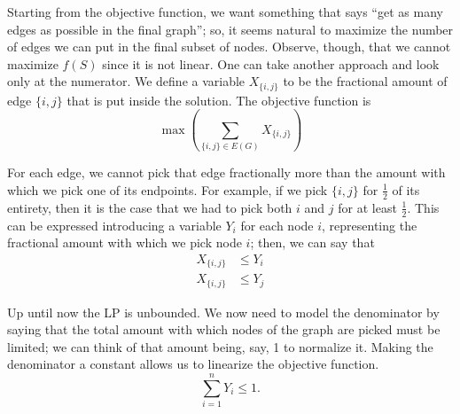 
Starting from the objective function, we want something that says ``get as many edges as possible in the final graph''; so, it seems natural to maximize the number of edges we can put in the final subset of nodes. Observe, though, that we cannot maximize $f(S)$ since it is not linear. One can take another approach and look only at the numerator. We define a variable $X_{\{i, j\}}$ to be the fractional amount of edge $\{i, j\}$ that is put inside the solution. The objective function is
\begin{equation}
    \max \left( \sum_{\{i, j\} \in E(G)}X_{\{i, j\}} \right)
\end{equation}

For each edge, we cannot pick that edge fractionally more than the amount with which we pick one of its endpoints. For example, if we pick $\{i, j\}$ for $\frac{1}{2}$ of its entirety, then it is the case that we had to pick both $i$ and $j$ for at least $\frac{1}{2}$. This can be expressed introducing a variable $Y_i$ for each node $i$, representing the fractional amount with which we pick node $i$; then, we can say that
\begin{equation}\label{eq:dsp_x_constraints}
    \begin{aligned}
        X_{\{i, j\}} &\leq Y_i \\
        X_{\{i, j\}} &\leq Y_j
    \end{aligned}
\end{equation}


Up until now the LP is unbounded. We now need to model the denominator by saying that the total amount with which nodes of the graph are picked must be limited; we can think of that amount being, say, 1 to normalize it. Making the denominator a constant allows us to linearize the objective function.
\begin{equation}\label{eq:dsp_y_constraint}
    \sum_{i = 1}^n Y_i \leq 1.
\end{equation}

